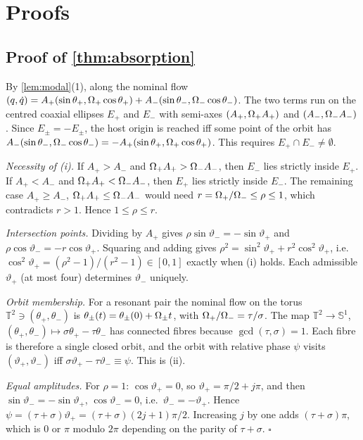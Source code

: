 \section{Proofs}\label{app:proofs}

\subsection{Proof of \cref{thm:absorption}}\label{app:absorption}
By \cref{lem:modal}(1), along the nominal flow
$(q,\dot q)=A_+(\sin\theta_+,\Omega_+\cos\theta_+)+A_-(\sin\theta_-,\Omega_-\cos\theta_-)$.
The two terms run on the centred coaxial ellipses $E_+$ and $E_-$ with semi-axes
$(A_+,\Omega_+ A_+)$ and $(A_-,\Omega_- A_-)$.
Since $E_\pm=-E_\pm$, the host origin is reached iff some point of the orbit has
$A_-(\sin\theta_-,\Omega_-\cos\theta_-)=-A_+(\sin\theta_+,\Omega_+\cos\theta_+)$.
This requires $E_+\cap E_-\neq\emptyset$.

\emph{Necessity of (i).}
If $A_+>A_-$ and $\Omega_+ A_+>\Omega_- A_-$, then $E_-$ lies strictly inside $E_+$.
If $A_+<A_-$ and $\Omega_+ A_+<\Omega_- A_-$, then $E_+$ lies strictly inside $E_-$.
The remaining case $A_+\ge A_-$, $\Omega_+ A_+\le\Omega_- A_-$ would need
$r=\Omega_+/\Omega_-\le\rho\le1$, which contradicts $r>1$.
Hence $1\le\rho\le r$.

\emph{Intersection points.}
Dividing by $A_+$ gives $\rho\sin\vartheta_-=-\sin\vartheta_+$ and
$\rho\cos\vartheta_-=-r\cos\vartheta_+$.
Squaring and adding gives $\rho^2=\sin^2\vartheta_++r^2\cos^2\vartheta_+$, i.e.\
$\cos^2\vartheta_+=(\rho^2-1)/(r^2-1)\in[0,1]$ exactly when (i) holds.
Each admissible $\vartheta_+$ (at most four) determines $\vartheta_-$ uniquely.

\emph{Orbit membership.}
For a resonant pair the nominal flow on the torus $\mathbb T^2\ni(\theta_+,\theta_-)$
is $\theta_\pm(t)=\theta_\pm(0)+\Omega_\pm t$, with $\Omega_+/\Omega_-=\tau/\sigma$.
The map $\mathbb T^2\to\mathbb S^1$, $(\theta_+,\theta_-)\mapsto\sigma\theta_+-\tau\theta_-$
has connected fibres because $\gcd(\tau,\sigma)=1$.
Each fibre is therefore a single closed orbit, and the orbit with relative phase
$\psi$ visits $(\vartheta_+,\vartheta_-)$ iff
$\sigma\vartheta_+-\tau\vartheta_-\equiv\psi$.
This is (ii).

\emph{Equal amplitudes.}
For $\rho=1$: $\cos\vartheta_+=0$, so $\vartheta_+=\pi/2+j\pi$, and then
$\sin\vartheta_-=-\sin\vartheta_+$, $\cos\vartheta_-=0$, i.e.\
$\vartheta_-=-\vartheta_+$.
Hence $\psi=(\tau+\sigma)\vartheta_+=(\tau+\sigma)(2j+1)\pi/2$.
Increasing $j$ by one adds $(\tau+\sigma)\pi$, which is $0$ or $\pi$ modulo
$2\pi$ depending on the parity of $\tau+\sigma$.
\hfill$\square$

